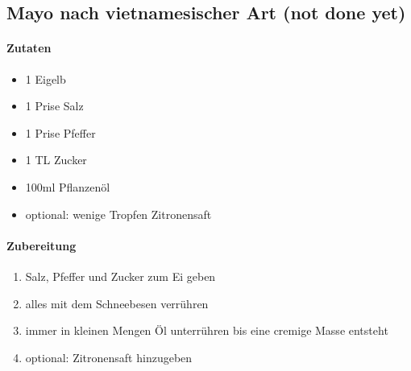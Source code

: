 \newpage
\subsection{Mayo nach vietnamesischer Art (not done yet)}
\paragraph{Zutaten}
\begin{itemize}[noitemsep]
	\item 1 Eigelb
	\item 1 Prise Salz
	\item 1 Prise Pfeffer 
	\item 1 TL Zucker
	\item 100ml Pflanzenöl
	\item optional: wenige Tropfen Zitronensaft
\end{itemize}
\paragraph{Zubereitung}
\begin{enumerate}[noitemsep]
	\item Salz, Pfeffer und Zucker zum Ei geben
	\item alles mit dem Schneebesen verrühren
	\item immer in kleinen Mengen Öl unterrühren bis eine cremige Masse entsteht
	\item optional: Zitronensaft hinzugeben
\end{enumerate}